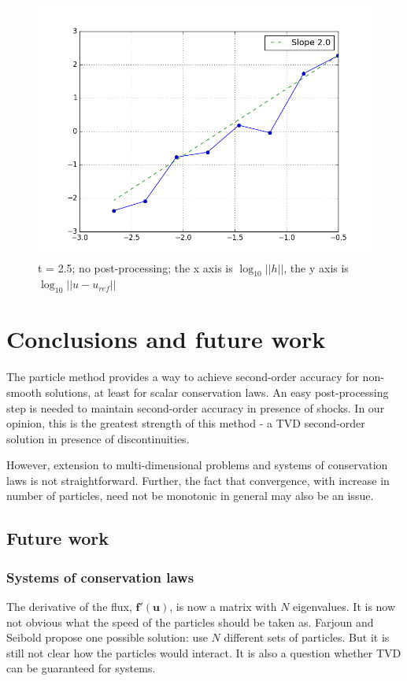 \documentclass{article}
\let\bld\boldsymbol
\begin{document}
\begin{figure}
	\centering
	\includegraphics[scale=0.5]{hp-t25-nolocate}
	\caption{t = 2.5; no post-processing; the x axis is $\log_{10}||h||$, the y axis is $\log_{10}||u-u_{ref}||$}
\end{figure}
 
\FloatBarrier

\section{Conclusions and future work}
The particle method provides a way to achieve second-order accuracy for non-smooth solutions, at least for scalar conservation laws. An easy post-processing step is needed to maintain second-order accuracy in presence of shocks. In our opinion, this is the greatest strength of this method - a TVD second-order solution in presence of discontinuities.

However, extension to multi-dimensional problems and systems of conservation laws is not straightforward. Further, the fact that convergence, with increase in number of particles, need not be monotonic in general may also be an issue.

\subsection{Future work}

\subsubsection{Systems of conservation laws}
The derivative of the flux, $\bld{f}'(\bld{u})$, is now a matrix with $N$ eigenvalues. It is now not obvious what the speed of the particles should be taken as. Farjoun and Seibold propose one possible solution: use $N$ different sets of particles. But it is still not clear how the particles would interact. It is also a question whether TVD can be guaranteed for systems.
\end{document}
